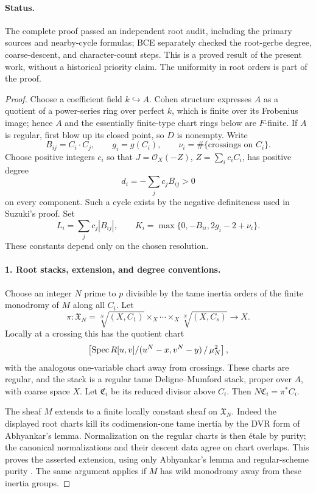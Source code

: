 \paragraph{Status.}
The complete proof passed an independent root audit, including the
primary sources and nearby-cycle formulas; BCE separately checked
the root-gerbe degree, coarse-descent, and character-count steps.
This is a proved result of the present work, without a historical
priority claim. The uniformity in root orders is part of the proof.

\begin{proof}
Choose a coefficient field $k\hookrightarrow A$. Cohen structure
expresses $A$ as a quotient of a power-series ring over perfect $k$,
which is finite over its Frobenius image; hence $A$ and the
essentially finite-type chart rings below are $F$-finite. If $A$ is regular, first blow up its closed point,
so $D$ is nonempty. Write
\[
 B_{ij}=C_i\cdot C_j,\qquad g_i=g(C_i),\qquad
 \nu_i=\#\{\text{crossings on }C_i\}.
\]
Choose positive integers $c_i$ so that
$J=\mathcal O_X(-Z)$, $Z=\sum_i c_iC_i$, has positive degree
\[
 d_i=-\sum_jc_j B_{ij}>0
\]
on every component. Such a cycle exists by the negative definiteness
used in Suzuki's proof. Set
\[
 L_i=\sum_jc_j|B_{ij}|,\qquad
 K_i=\max\{0,-B_{ii},2g_i-2+\nu_i\}.
 \tag{F8.1}
\]
These constants depend only on the chosen resolution.

\paragraph{1. Root stacks, extension, and degree conventions.}
Choose an integer $N$ prime to $p$ divisible by the tame inertia
orders of the finite monodromy of $M$ along all $C_i$. Let
\[
 \pi:\mathfrak X_N=\sqrt[N]{(X,C_1)}\mathbin{\times_X}\cdots
                 \mathbin{\times_X}\sqrt[N]{(X,C_s)}\longrightarrow X.
\]
Locally at a crossing this has the quotient chart
\[
 \left[\operatorname{Spec} R[u,v]/(u^N-x,v^N-y)\,/\,\mu_N^2\right],
\]
with the analogous one-variable chart away from crossings.
These charts are regular, and the stack is a regular tame
Deligne--Mumford stack, proper over $A$, with coarse space $X$.
Let $\mathfrak C_i$ be its reduced divisor above $C_i$. Then
$N\mathfrak C_i=\pi^*C_i$.

The sheaf $M$ extends to a finite locally constant sheaf on
$\mathfrak X_N$. Indeed the displayed root charts kill its
codimension-one tame inertia by the DVR form of Abhyankar's lemma.
Normalization on the regular charts is then \'etale by purity;
the canonical normalizations and their descent data agree on
chart overlaps. This proves the asserted extension, using only
Abhyankar's lemma and regular-scheme purity
\cite[tags 0BRM and 0BMB]{StacksAbhyankar,StacksBranchPurity}.
The same argument applies if $M$ has wild monodromy away from
these inertia groups.


\end{proof}
